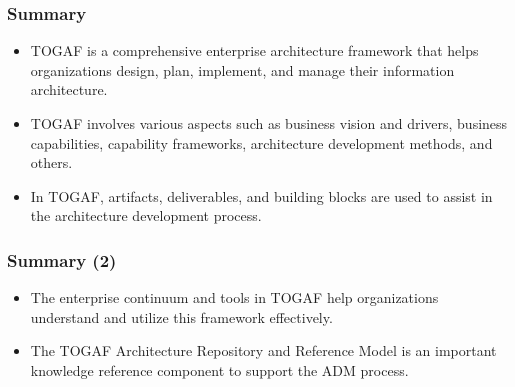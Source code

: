\documentclass[aspectratio=169, table]{beamer}
\begin{document}
	\begin{frame}
		\frametitle{Summary}
		\begin{itemize}
			\item TOGAF is a comprehensive enterprise architecture framework that helps organizations design, plan, implement, and manage their information architecture.
			\item TOGAF involves various aspects such as business vision and drivers, business capabilities, capability frameworks, architecture development methods, and others.
			\item In TOGAF, artifacts, deliverables, and building blocks are used to assist in the architecture development process.
		\end{itemize}
	\end{frame}
	
	\begin{frame}
		\frametitle{Summary (2)}
		\begin{itemize}
			\item The enterprise continuum and tools in TOGAF help organizations understand and utilize this framework effectively.
			\item The TOGAF Architecture Repository and Reference Model is an important knowledge reference component to support the ADM process.
		\end{itemize}
	\end{frame}
	
	
\end{document}
